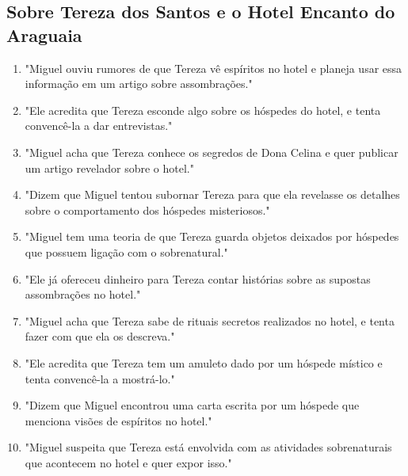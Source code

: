 \subsection*{Sobre Tereza dos Santos e o Hotel Encanto do Araguaia}
\begin{enumerate}
    \item "Miguel ouviu rumores de que Tereza vê espíritos no hotel e planeja usar essa informação em um artigo sobre assombrações."
    \item "Ele acredita que Tereza esconde algo sobre os hóspedes do hotel, e tenta convencê-la a dar entrevistas."
    \item "Miguel acha que Tereza conhece os segredos de Dona Celina e quer publicar um artigo revelador sobre o hotel."
    \item "Dizem que Miguel tentou subornar Tereza para que ela revelasse os detalhes sobre o comportamento dos hóspedes misteriosos."
    \item "Miguel tem uma teoria de que Tereza guarda objetos deixados por hóspedes que possuem ligação com o sobrenatural."
    \item "Ele já ofereceu dinheiro para Tereza contar histórias sobre as supostas assombrações no hotel."
    \item "Miguel acha que Tereza sabe de rituais secretos realizados no hotel, e tenta fazer com que ela os descreva."
    \item "Ele acredita que Tereza tem um amuleto dado por um hóspede místico e tenta convencê-la a mostrá-lo."
    \item "Dizem que Miguel encontrou uma carta escrita por um hóspede que menciona visões de espíritos no hotel."
    \item "Miguel suspeita que Tereza está envolvida com as atividades sobrenaturais que acontecem no hotel e quer expor isso."
\end{enumerate}

